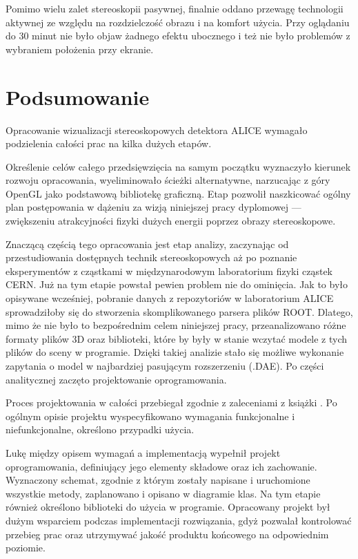 Pomimo wielu zalet stereoskopii pasywnej, finalnie oddano przewagę technologii aktywnej ze względu na rozdzielczość obrazu i na komfort użycia. Przy oglądaniu do 30 minut nie było objaw żadnego efektu ubocznego i też nie było problemów z wybraniem położenia przy ekranie.

\newpage
\section{Podsumowanie}
Opracowanie wizualizacji stereoskopowych detektora ALICE wymagało podzielenia całości prac na kilka dużych etapów.

Określenie celów całego przedsięwzięcia na samym początku wyznaczyło kierunek rozwoju opracowania, wyeliminowało ścieżki alternatywne, narzucając z góry OpenGL jako podstawową bibliotekę graficzną. Etap pozwolił naszkicować ogólny plan postępowania w dążeniu za wizją niniejszej pracy dyplomowej --- zwiększeniu atrakcyjności fizyki dużych energii poprzez obrazy stereoskopowe.

Znaczącą częścią tego opracowania jest etap analizy, zaczynając od przestudiowania dostępnych technik stereoskopowych aż po poznanie eksperymentów z cząstkami w międzynarodowym laboratorium fizyki cząstek CERN. Już na tym etapie powstał pewien problem nie do ominięcia. Jak to było opisywane wcześniej, pobranie danych z repozytoriów w laboratorium ALICE sprowadziłoby się do stworzenia skomplikowanego parsera plików ROOT. Dlatego, mimo że nie było to bezpośrednim celem niniejszej pracy, przeanalizowano różne formaty plików 3D oraz biblioteki, które by były w stanie wczytać modele z tych plików do sceny w programie. Dzięki takiej analizie stało się możliwe wykonanie zapytania o model w najbardziej pasującym rozszerzeniu (.DAE). Po części analitycznej zaczęto projektowanie oprogramowania.

Proces projektowania w całości przebiegał zgodnie z zaleceniami z książki \cite{specyfikacja}. Po ogólnym opisie projektu wyspecyfikowano wymagania funkcjonalne i niefunkcjonalne, określono przypadki użycia.

Lukę między opisem wymagań a implementacją wypełnił projekt oprogramowania, definiujący jego elementy składowe oraz ich zachowanie. Wyznaczony schemat, zgodnie z którym zostały napisane i uruchomione wszystkie metody, zaplanowano i opisano w diagramie klas. Na tym etapie również określono biblioteki do użycia w programie. Opracowany projekt był dużym wsparciem podczas implementacji rozwiązania, gdyż pozwalał kontrolować przebieg prac oraz utrzymywać jakość produktu końcowego na odpowiednim poziomie.

